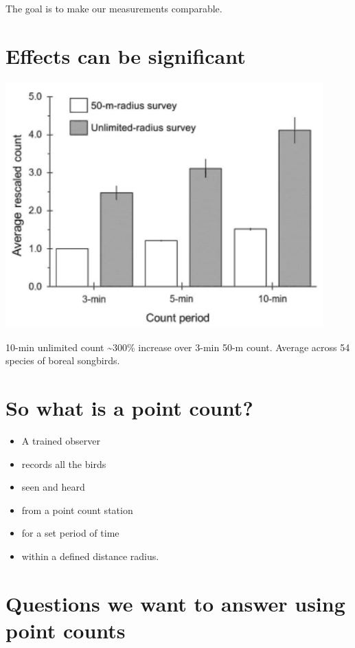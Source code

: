 \documentclass[12pt,]{book}
\providecommand{\tightlist}{%
  \setlength{\itemsep}{0pt}\setlength{\parskip}{0pt}}
\begin{document}
The goal is to make our measurements comparable.

\hypertarget{effects-can-be-significant}{%
\section{Effects can be significant}\label{effects-can-be-significant}}

\includegraphics[width=4.82in]{./images/matsuoka-2014-fig-2}

10-min unlimited count \textasciitilde{}300\% increase over 3-min 50-m count.
Average across 54 species of boreal songbirds.

\hypertarget{so-what-is-a-point-count}{%
\section{So what is a point count?}\label{so-what-is-a-point-count}}

\begin{itemize}
\tightlist
\item
  A trained observer
\item
  records all the birds
\item
  seen and heard
\item
  from a point count station
\item
  for a set period of time
\item
  within a defined distance radius.
\end{itemize}

\hypertarget{questions-we-want-to-answer-using-point-counts}{%
\section{Questions we want to answer using point counts}\label{questions-we-want-to-answer-using-point-counts}}
\end{document}
